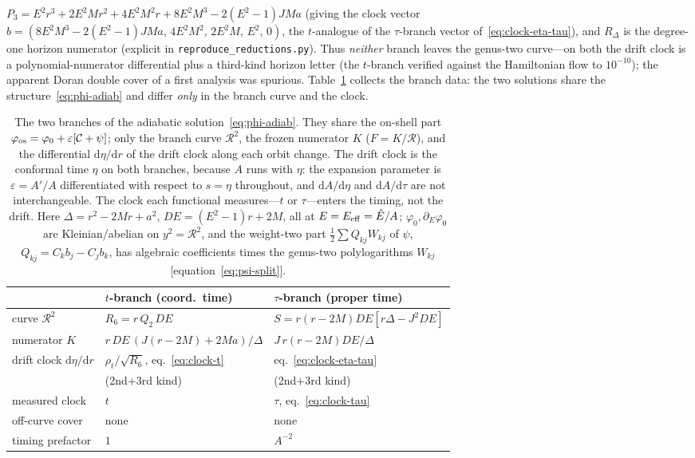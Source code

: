 \documentclass[12pt]{iopart}
\theoremstyle{plain}
\theoremstyle{definition}
\theoremstyle{remark}
\newcommand{\Ehat}{\hat E}
\newcommand{\dd}{\mathrm{d}}
\begin{document}
$P_3=E^2r^3+2E^2Mr^2+4E^2M^2r+8E^2M^3-2(E^2-1)JMa$ (giving the clock vector
$b=(8E^2M^3-2(E^2-1)JMa,\,4E^2M^2,\,2E^2M,\,E^2,\,0)$, the $t$-analogue of the
$\tau$-branch vector of~\eqref{eq:clock-eta-tau}), and $R_\Delta$ is the degree-one horizon numerator
(explicit in \texttt{reproduce\_reductions.py}). Thus \emph{neither} branch leaves
the genus-two curve---on both the drift clock is a polynomial-numerator differential plus a
third-kind horizon letter (the $t$-branch verified against the Hamiltonian flow to
$10^{-10}$); the apparent Doran double cover of a first analysis was spurious. Table~\ref{tab:branch-adiab}
collects the branch data: the two solutions share the structure~\eqref{eq:phi-adiab}
and differ \emph{only} in the branch curve and the clock.
\begin{table}[htbp]
    \centering
    \caption{The two branches of the adiabatic solution~\eqref{eq:phi-adiab}. They
    share the on-shell part $\varphi_{\rm os}=\varphi_0+\varepsilon[\mathcal{C}+\psi]$;
    only the branch curve $\mathcal{R}^2$, the frozen numerator $K$
    ($F=K/\mathcal{R}$), and the differential $\dd\eta/\dd r$ of the drift clock
    along each orbit change. The drift clock is the conformal time $\eta$ on both
    branches, because $A$ runs with $\eta$: the expansion parameter is
    $\varepsilon=A'/A$ differentiated with respect to $s=\eta$ throughout, and
    $\dd A/\dd\eta$ and $\dd A/\dd\tau$ are not interchangeable. The clock each
    functional measures---$t$ or $\tau$---enters the timing, not the drift. Here
    $\Delta=r^2-2Mr+a^2$, $DE=(E^2-1)r+2M$, all at $E=E_{\rm eff}=\Ehat/A$;
    $\varphi_0,\partial_E\varphi_0$ are Kleinian/abelian on $y^2=\mathcal{R}^2$, and
    the weight-two part $\tfrac12\sum Q_{kj}W_{kj}$ of $\psi$, $Q_{kj}=C_kb_j-C_jb_k$, has
    algebraic coefficients times the genus-two polylogarithms $W_{kj}$ [equation~\eqref{eq:psi-split}].}
    \label{tab:branch-adiab}
    \begin{tabular}{lll}
        \hline\hline
         & $t$-branch (coord.\ time) & $\tau$-branch (proper time)\\
        \hline
        curve $\mathcal{R}^2$ & $R_6=r\,Q_2\,DE$ & $S=r(r{-}2M)DE[r\Delta{-}J^2DE]$\\
        numerator $K$ & $r\,DE\,(J(r{-}2M){+}2Ma)/\Delta$ & $J\,r(r{-}2M)DE/\Delta$\\
        drift clock $\dd\eta/\dd r$ & $\rho_t/\sqrt{R_6}$, eq.~\eqref{eq:clock-t}
            & eq.~\eqref{eq:clock-eta-tau}\\
         & (2nd$+$3rd kind) & (2nd$+$3rd kind)\\
        measured clock & $t$ & $\tau$, eq.~\eqref{eq:clock-tau}\\
        off-curve cover & none & none\\
        timing prefactor & $1$ & $A^{-2}$\\
        \hline\hline
    \end{tabular}
\end{table}
\end{document}

